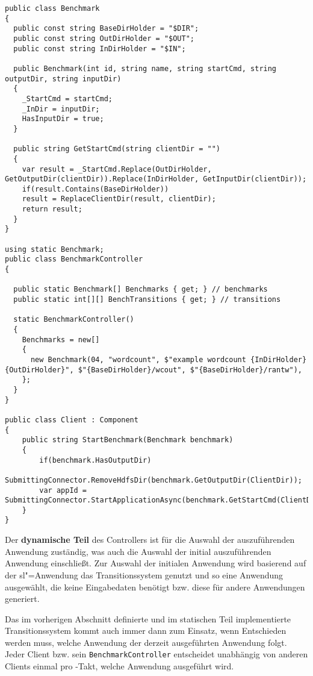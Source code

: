 \begin{lstlisting}[label=lst:benchmarkDefinition,style=cs,
caption={[Definition und Start einer Anwendung]
    Definition und Start einer Anwendung (gekürztes Beispiel).
    Die Generierung des komplettes Startbefehls mit Nutzung des Benchmark"=Scriptes führt der vom Client verwendete Connector durch, weshalb hier nur definiert werden muss, dass das Example"=Programm \acl{wc} gestartet wird.}]
public class Benchmark
{
  public const string BaseDirHolder = "$DIR";
  public const string OutDirHolder = "$OUT";
  public const string InDirHolder = "$IN";
  
  public Benchmark(int id, string name, string startCmd, string outputDir, string inputDir)
  {
    _StartCmd = startCmd;
    _InDir = inputDir;
    HasInputDir = true;
  }
  
  public string GetStartCmd(string clientDir = "")
  {
    var result = _StartCmd.Replace(OutDirHolder, GetOutputDir(clientDir)).Replace(InDirHolder, GetInputDir(clientDir));
    if(result.Contains(BaseDirHolder))
    result = ReplaceClientDir(result, clientDir);
    return result;
  }
}

using static Benchmark;
public class BenchmarkController
{
  
  public static Benchmark[] Benchmarks { get; } // benchmarks
  public static int[][] BenchTransitions { get; } // transitions
  
  static BenchmarkController()
  {
    Benchmarks = new[]
    {
      new Benchmark(04, "wordcount", $"example wordcount {InDirHolder} {OutDirHolder}", $"{BaseDirHolder}/wcout", $"{BaseDirHolder}/rantw"),
    };
  }
}

public class Client : Component
{
    public string StartBenchmark(Benchmark benchmark)
    {
        if(benchmark.HasOutputDir)
        SubmittingConnector.RemoveHdfsDir(benchmark.GetOutputDir(ClientDir));
        var appId = SubmittingConnector.StartApplicationAsync(benchmark.GetStartCmd(ClientDir));
    }
}
\end{lstlisting}

Der \textbf{dynamische Teil} des Controllers ist für die Auswahl der auszuführenden Anwendung zuständig, was auch die Auswahl der initial auszuführenden Anwendung einschließt.
Zur Auswahl der initialen Anwendung wird basierend auf der \acl{sl}"=Anwendung das Transitionssystem genutzt und so eine Anwendung ausgewählt, die keine Eingabedaten benötigt bzw. diese für andere Anwendungen generiert.

Das im vorherigen Abschnitt definierte und im statischen Teil implementierte Transitionssystem kommt auch immer dann zum Einsatz, wenn Entschieden werden muss, welche Anwendung der derzeit ausgeführten Anwendung folgt.
Jeder Client bzw. sein \texttt{BenchmarkController} entscheidet unabhängig von anderen Clients einmal pro \sS-Takt, welche Anwendung ausgeführt wird.

